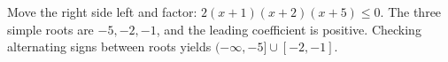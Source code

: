 Move the right side left and factor: $2(x+1)(x+2)(x+5)\le0$. The three simple roots are $-5,-2,-1$, and the leading coefficient is positive. Checking alternating signs between roots yields $\boxed{(-\infty,-5]\cup[-2,-1]}$.
